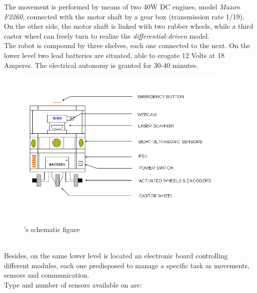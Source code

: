 The movement is performed by means of two 40W DC engines, model
\textit{Maxon F2260}, connected with the motor shaft by a gear
box (transmission rate 1/19). On the other side, the motor shaft
is linked with two rubber wheels, while a third castor wheel can
freely turn to realize the \textit{differential-driven} model.
\\
The robot is compound by three shelves, each one connected to
the next. On the lower level two lead batteries are situated,
able to erogate 12 Volts at 18 Amperes. The electrical autonomy is
granted for 30-40 minutes.
\begin{figure}[h]
  \begin{center}
    \includegraphics[width=300pt]{img/Morduc_scheme.png}
    \caption{\morduc{}'s schematic figure}
    \label{fig:morduc_scheme}
  \end{center}
\end{figure}
\\
Besides, on the same lower level is located an electronic board
controlling different modules, each one predisposed to manage a
specific task as movements, sensors and communication.
\\
Type and number of sensors available on \morduc{} are:


